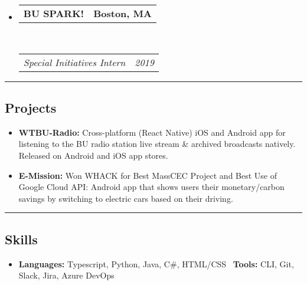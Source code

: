\documentclass[11pt,letterpaper]{article}
\makeatletter
\newcommand{\headerrow}[2]
{\begin{tabular*}{\linewidth}{l@{\extracolsep{\fill}}r}
	#1 &
	#2 \\
\end{tabular*}}
\makeatother
\begin{document}
\begin{itemize}
	\item
	\headerrow
		{\textbf{BU SPARK!}}
		{\textbf{Boston, MA}}
	\\
	\headerrow
		{\emph{Special Initiatives Intern}}
		{\emph{2019}}
	

\end{itemize}

\hrule
\vspace{-0.4em}
\subsection*{Projects}

\begin{itemize}
	\parskip=0.1em
	
	\item \textbf{WTBU-Radio:}
		Cross-platform (React Native) iOS and Android app for listening to the BU radio station live stream \& archived broadcasts natively. Released on Android and iOS app stores.
	
	\item \textbf{E-Mission:}
		Won WHACK for Best MassCEC Project and Best Use of Google Cloud API: Android app that shows users their monetary/carbon savings by switching to electric cars based on their driving. 
	
\end{itemize}

\hrule
\vspace{-0.4em}
\subsection*{Skills}

\begin{itemize}
	\parskip=0.1em

	\item \textbf{Languages:} Typescript, Python, Java, C\#, HTML/CSS \
	\textbullet \textbf{Tools:} CLI, Git, Slack, Jira, Azure DevOps
	
\end{itemize}
\end{document}
